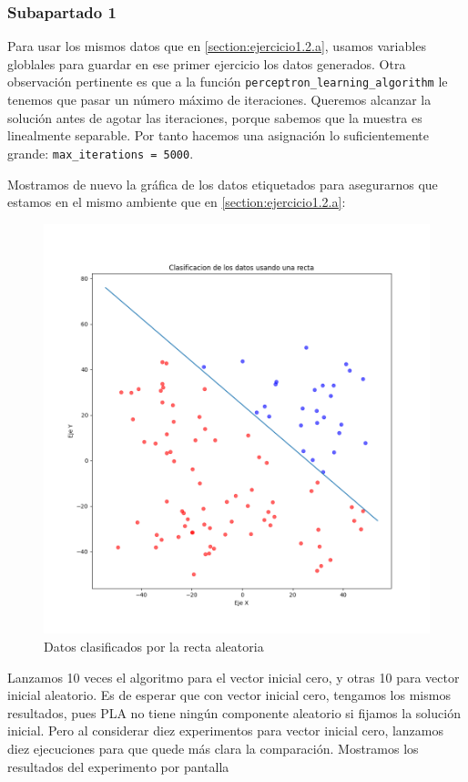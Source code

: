 \documentclass[11pt]{article}
\begin{document}
\subsubsection{Subapartado 1}

Para usar los mismos datos que en \ref{section:ejercicio1.2.a}, usamos variables globlales para guardar en ese primer ejercicio los datos generados. Otra observación pertinente es que a la función \lstinline{perceptron_learning_algorithm} le tenemos que pasar un número máximo de iteraciones. Queremos alcanzar la solución antes de agotar las iteraciones, porque sabemos que la muestra es linealmente separable. Por tanto hacemos una asignación lo suficientemente grande: \lstinline{max_iterations = 5000}.

Mostramos de nuevo la gráfica de los datos etiquetados para asegurarnos que estamos en el mismo ambiente que en \ref{section:ejercicio1.2.a}:

\begin{figure}[H]
    \centering
    \includegraphics[scale=0.3]{puntos_clasificados_recta02}
    \caption{Datos clasificados por la recta aleatoria}
\end{figure}

Lanzamos 10 veces el algoritmo para el vector inicial cero, y otras 10 para vector inicial aleatorio. Es de esperar que con vector inicial cero, tengamos los mismos resultados, pues PLA no tiene ningún componente aleatorio si fijamos la solución inicial. Pero al considerar diez experimentos para vector inicial cero, lanzamos diez ejecuciones para que quede más clara la comparación. Mostramos los resultados del experimento por pantalla
\end{document}
